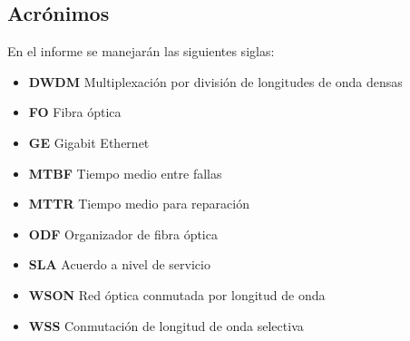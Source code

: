 \subsection{Acrónimos}
\label{sec:acronimos}

En el informe se manejarán las siguientes siglas:
\begin{itemize}
\item \textbf{DWDM} Multiplexación por división de longitudes de onda densas
\item \textbf{FO} Fibra óptica
\item \textbf{GE} Gigabit Ethernet
\item \textbf{MTBF} Tiempo medio entre fallas
\item \textbf{MTTR} Tiempo medio para reparación
\item \textbf{ODF} Organizador de fibra óptica
\item \textbf{SLA} Acuerdo a nivel de servicio
\item \textbf{WSON} Red óptica conmutada por longitud de onda
\item \textbf{WSS} Conmutación de longitud de onda selectiva
\end{itemize}